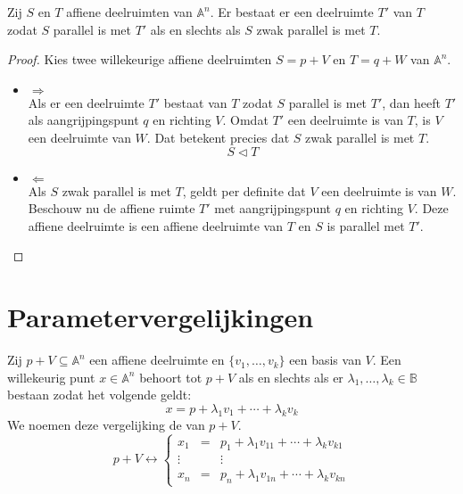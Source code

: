 \documentclass[main.tex]{subfiles}
\begin{document}
\begin{st}
  Zij $S$ en $T$ affiene deelruimten van $\mathbb{A}^{n}$.
  Er bestaat er een deelruimte $T'$ van $T$ zodat $S$ parallel is met $T'$ als en slechts als $S$ zwak parallel is met $T$.

  \begin{proof}
    Kies twee willekeurige affiene deelruimten $S = p + V$ en $T = q + W$ van $\mathbb{A}^{n}$.
    \begin{itemize}
    \item $\Rightarrow$\\
      Als er een deelruimte $T'$ bestaat van $T$ zodat $S$ parallel is met $T'$, dan heeft $T'$ als aangrijpingspunt $q$ en richting $V$.
      Omdat $T'$ een deelruimte is van $T$, is $V$ een deelruimte van $W$.
      Dat betekent precies dat $S$ zwak parallel is met $T$.
      \[ S \vartriangleleft T \]
    \item $\Leftarrow$\\
      Als $S$ zwak parallel is met $T$, geldt per definite dat $V$ een deelruimte is van $W$.
      Beschouw nu de affiene ruimte $T'$ met aangrijpingspunt $q$ en richting $V$.
      Deze affiene deelruimte is een affiene deelruimte van $T$ en $S$ is parallel met $T'$.
    \end{itemize}
  \end{proof}
\end{st}

\section{Parametervergelijkingen}
\label{sec:parametervergelijkingen}
\begin{de}
  Zij $p+V \subseteq \mathbb{A}^{n}$ een affiene deelruimte en $\{v_{1},\dotsc,v_{k}\}$ een basis van $V$.
  Een willekeurig punt $x\in \mathbb{A}^{n}$ behoort tot $p+V$ als en slechts als er $\lambda_{1},\dotsc,\lambda_{k} \in \mathbb{B}$ bestaan zodat het volgende geldt:
  \[
  x = p + \lambda_1v_1 + \dotsb + \lambda_{k}v_{k}  
  \]
  We noemen deze vergelijking de  van $p+V$.
  \[
  p+V \leftrightarrow
  \left\{
  \begin{array}{rcl}
  x_{1} &=& p_{1} + \lambda_{1}v_{11} + \dotsb + \lambda_{k}v_{k1}\\
  \vdots && \vdots\\
  x_{n} &=& p_{n} + \lambda_{1}v_{1n} + \dotsb + \lambda_{k}v_{kn}
  \end{array}
  \right.
  \]
\end{de}
\end{document}
